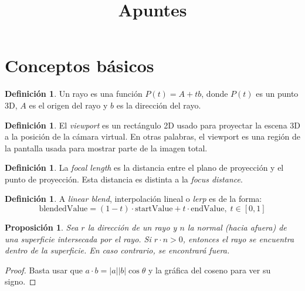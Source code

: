 \documentclass[12pt]{article}
\newtheorem{prop}[theorem]{Proposición}
\theoremstyle{definition}
\newtheorem{definition}[theorem]{Definición}
\theoremstyle{remark}
\begin{document}
\title{Apuntes}
\maketitle

\section{Conceptos básicos}

\begin{definition}
Un rayo es una función $P(t)=A+tb$, donde $P(t)$ es un punto 3D, $A$ es el origen del rayo y $b$ es la dirección del rayo.
\end{definition}

\begin{definition}
El \textit{viewport} es un rectángulo 2D usado para proyectar la escena 3D a la posición de la cámara virtual. En otras palabras, el viewport es una región de la pantalla usada para mostrar parte de la imagen total. 
\end{definition}

\begin{definition}
La \textit{focal length} es la distancia entre el plano de proyección y el punto de proyección. Esta distancia es distinta a la \textit{focus distance}.
\end{definition}

\begin{definition}
A \textit{linear blend}, interpolación lineal o \textit{lerp} es de la forma:
\[
\text{blendedValue} = (1-t)\cdot\text{startValue}+t\cdot\text{endValue}, \; t\in[0,1]
\]
\end{definition}

\begin{prop}
Sea $r$ la dirección de un rayo y $n$ la normal (hacia afuera) de una superficie intersecada por el rayo. Si $r\cdot n>0$, entonces el rayo se encuentra dentro de la superficie. En caso contrario, se encontrará fuera.
\end{prop}

\begin{proof}
Basta usar que $a\cdot b = |a||b|\cos\theta$ y la gráfica del coseno para ver su signo.
\end{proof}
\end{document}
